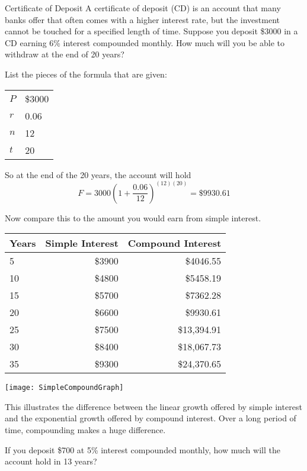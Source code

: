 \begin{example}[https://www.youtube.com/watch?v=UCQJgC0nRxA&list=PLfmpjsIzhztsZtnb7HnXrQ8SLoiOCIcAM&index=16]{Certificate of Deposit}
A certificate of deposit (CD) is an account that many banks offer that often comes with a higher interest rate, but the investment cannot be touched for a specified length of time.  Suppose you deposit \$3000 in a CD earning 6\% interest compounded monthly.  How much will you be able to withdraw at the end of 20 years?

\sol
List the pieces of the formula that are given:
\begin{center}
\begin{tabular}{l l}
$P$ & \$3000\\
$r$ & 0.06\\
$n$ & 12\\
$t$ & 20
\end{tabular}
\end{center}
So at the end of the 20 years, the account will hold 
\[F = 3000\left(1+\dfrac{0.06}{12}\right)^{(12)(20)} = \boxed{\$9930.61}\]

\solline
Now compare this to the amount you would earn from simple interest.
\begin{center}
\begin{tabular}{l | r | r}
Years & Simple Interest & Compound Interest\\
\hline
5 & \$3900 & \$4046.55\\
10 & \$4800 & \$5458.19\\
15 & \$5700 & \$7362.28\\
20 & \$6600 & \$9930.61\\
25 & \$7500 & \$13,394.91\\
30 & \$8400 & \$18,067.73\\
35 & \$9300 & \$24,370.65
\end{tabular}
\vspace{0.2in}

\texttt{[image: SimpleCompoundGraph]}
\end{center}
This illustrates the difference between the linear growth offered by simple interest and the exponential growth offered by compound interest.  Over a long period of time, compounding makes a huge difference.
\end{example}

\begin{try}
If you deposit \$700 at 5\% interest compounded monthly, how much will the account hold in 13 years?
\end{try}
\pagebreak
\text{}
\vfill

